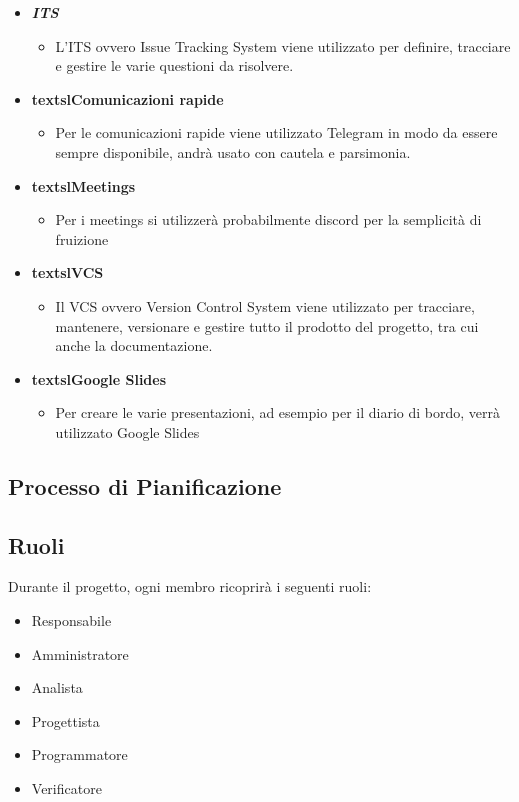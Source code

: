 \begin{itemize}
\item \textbf{\textsl{ITS}}
\begin{itemize} \item L'ITS ovvero Issue Tracking System viene utilizzato per definire, tracciare e gestire le varie questioni da risolvere.\end{itemize}

\item \textbf{textsl{Comunicazioni rapide}}
\begin{itemize} \item Per le comunicazioni rapide viene utilizzato Telegram in modo da essere sempre disponibile, andrà usato con cautela e parsimonia.\end{itemize}

\item \textbf{textsl{Meetings}}
\begin{itemize} \item Per i meetings si utilizzerà probabilmente discord per la semplicità di fruizione\end{itemize}

\item \textbf{textsl{VCS}}
\begin{itemize} \item Il VCS ovvero Version Control System viene utilizzato per tracciare, mantenere, versionare e gestire tutto il prodotto del progetto, tra cui anche la documentazione.\end{itemize}

\item \textbf{textsl{Google Slides}}
\begin{itemize} \item Per creare le varie presentazioni, ad esempio per il diario di bordo, verrà utilizzato Google Slides\end{itemize}
\end{itemize}

\subsection{Processo di Pianificazione}

\subsection{Ruoli}

Durante il progetto, ogni membro ricoprirà i seguenti ruoli:
\begin{itemize}
\item Responsabile
\item Amministratore
\item Analista
\item Progettista
\item Programmatore
\item Verificatore
\end{itemize}

